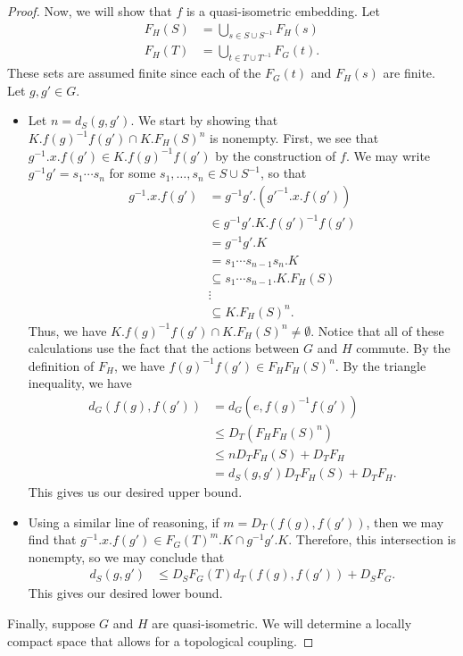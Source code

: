\documentclass[10pt]{mypackage}
\begin{document}
\begin{proof}
  Now, we will show that $f$ is a quasi-isometric embedding. Let
  \begin{align*}
    F_H(S) &= \bigcup_{s\in S\cup S^{-1}}F_H(s)\\
    F_H(T) &= \bigcup_{t\in T\cup T^{-1}} F_G(t).
  \end{align*}
  These sets are assumed finite since each of the $F_G(t)$ and $F_H(s)$ are finite. Let $g,g'\in G$.
  \begin{itemize}
    \item Let $n = d_S\left( g,g' \right)$. We start by showing that $K.f(g)^{-1}f(g')\cap K.F_H(S)^{n}$ is nonempty. First, we see that $g^{-1}.x.f(g')\in K.f(g)^{-1}f(g')$ by the construction of $f$. We may write $g^{-1}g' = s_1\cdots s_n$ for some $s_1,\dots,s_n\in S\cup S^{-1}$, so that
      \begin{align*}
        g^{-1}.x.f(g') &= g^{-1}g'.\left( g'^{-1}.x.f(g') \right)\\
                       &\in g^{-1}g'.K.f(g')^{-1}f(g')\\
                       &= g^{-1}g'.K\\
                       &= s_1\cdots s_{n-1}s_n.K\\
                       &\subseteq s_1\cdots s_{n-1}.K.F_H(S)\\
                       &\vdots\\
                       &\subseteq K.F_H(S)^{n}.
      \end{align*}
      Thus, we have $K.f(g)^{-1}f(g')\cap K.F_H(S)^{n}\neq \emptyset$. Notice that all of these calculations use the fact that the actions between $G$ and $H$ commute. By the definition of $F_H$, we have $f(g)^{-1}f(g')\in F_HF_H(S)^{n}$. By the triangle inequality, we have
      \begin{align*}
        d_G\left( f(g),f(g') \right) &= d_G\left( e,f(g)^{-1}f(g') \right)\\
                                     &\leq D_T\left( F_HF_H(S)^{n} \right)\\
                                     &\leq nD_TF_H(S) + D_TF_H\\
                                     &= d_S\left( g,g' \right)D_TF_H(S) + D_TF_H.
      \end{align*}
      This gives us our desired upper bound.
    \item Using a similar line of reasoning, if $m = D_T\left( f(g),f(g') \right)$, then we may find that $g^{-1}.x.f(g')\in F_G(T)^{m}.K\cap g^{-1}g'.K$. Therefore, this intersection is nonempty, so we may conclude that
      \begin{align*}
        d_S\left( g,g' \right) &\leq D_SF_G(T)d_T\left( f(g),f(g') \right) + D_SF_G.
      \end{align*}
      This gives our desired lower bound.
  \end{itemize}
  Finally, suppose $G$ and $H$ are quasi-isometric. We will determine a locally compact space that allows for a topological coupling.


\end{proof}
\end{document}
